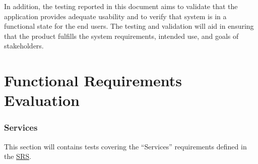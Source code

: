 \documentclass[12pt, titlepage]{article}
\begin{document}
In addition, the testing reported in this document aims to validate that the application provides
adequate usability and to verify that system is in a functional state for the end users. The
testing and validation will aid in ensuring that the product fulfills the system requirements,
intended use, and goals of stakeholders.

\section{Functional Requirements Evaluation}

\subsubsection{Services}

This section will contains tests covering the ``Services'' requirements defined in the
\href{https://github.com/arkinmodi/project-sayyara/blob/main/docs/SRS/SRS.pdf}{SRS}.
\end{document}
